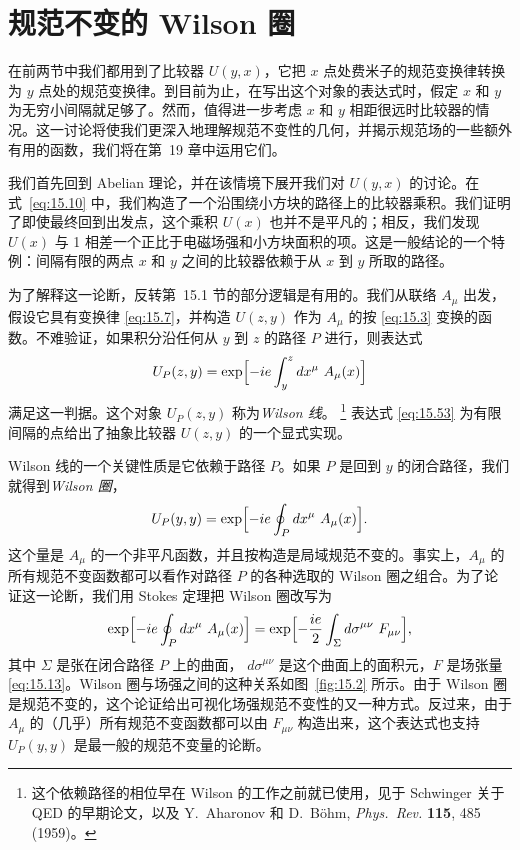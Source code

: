 \section{规范不变的 Wilson 圈}

在前两节中我们都用到了比较器 $U(y,x)$，它把 $x$ 点处费米子的规范变换律转换为 $y$ 点处的规范变换律。到目前为止，在写出这个对象的表达式时，假定 $x$ 和 $y$ 为无穷小间隔就足够了。然而，值得进一步考虑 $x$ 和 $y$ 相距很远时比较器的情况。这一讨论将使我们更深入地理解规范不变性的几何，并揭示规范场的一些额外有用的函数，我们将在第~19 章中运用它们。

我们首先回到 Abelian 理论，并在该情境下展开我们对 $U(y,x)$ 的讨论。在式~\eqref{eq:15.10} 中，我们构造了一个沿围绕小方块的路径上的比较器乘积。我们证明了即使最终回到出发点，这个乘积 $U(x)$ 也并不是平凡的；相反，我们发现 $U(x)$ 与 1 相差一个正比于电磁场强和小方块面积的项。这是一般结论的一个特例：间隔有限的两点 $x$ 和 $y$ 之间的比较器依赖于从 $x$ 到 $y$ 所取的路径。

为了解释这一论断，反转第~15.1 节的部分逻辑是有用的。我们从联络 $A_\mu$ 出发，假设它具有变换律 \eqref{eq:15.7}，并构造 $U(z,y)$ 作为 $A_\mu$ 的按 \eqref{eq:15.3} 变换的函数。不难验证，如果积分沿任何从 $y$ 到 $z$ 的路径 $P$ 进行，则表达式
\begin{equation}
  U_P(z,y) = \exp\Bigl[ -ie\int_y^z dx^\mu\ A_\mu(x) \Bigr]
  \label{eq:15.53}
\end{equation}
满足这一判据。这个对象 $U_P(z,y)$ 称为\emph{Wilson 线}。%
\footnote{这个依赖路径的相位早在 Wilson 的工作之前就已使用，见于 Schwinger 关于 QED 的早期论文，以及 Y.~Aharonov 和 D.~B\"ohm, \emph{Phys.\ Rev.} \textbf{115}, 485 (1959)。} 表达式 \eqref{eq:15.53} 为有限间隔的点给出了抽象比较器 $U(z,y)$ 的一个显式实现。

Wilson 线的一个关键性质是它依赖于路径 $P$。如果 $P$ 是回到 $y$ 的闭合路径，我们就得到\emph{Wilson 圈}，
\begin{equation}
  U_P(y,y) = \exp\Bigl[ -ie\oint_P dx^\mu\ A_\mu(x) \Bigr] .
  \label{eq:15.54}
\end{equation}
这个量是 $A_\mu$ 的一个非平凡函数，并且按构造是局域规范不变的。事实上，$A_\mu$ 的所有规范不变函数都可以看作对路径 $P$ 的各种选取的 Wilson 圈之组合。为了论证这一论断，我们用 Stokes 定理把 Wilson 圈改写为
\begin{equation}
  \exp\Bigl[ -ie\oint_P dx^\mu\ A_\mu(x) \Bigr]
  = \exp\Bigl[ -\frac{ie}{2}\int_\Sigma d\sigma^{\mu\nu}\ F_{\mu\nu} \Bigr],
  \label{eq:15.55}
\end{equation}
其中 $\Sigma$ 是张在闭合路径 $P$ 上的曲面，
$d\sigma^{\mu\nu}$ 是这个曲面上的面积元，$F$ 是场张量 \eqref{eq:15.13}。Wilson 圈与场强之间的这种关系如图~\ref{fig:15.2} 所示。由于 Wilson 圈是规范不变的，这个论证给出可视化场强规范不变性的又一种方式。反过来，由于 $A_\mu$ 的（几乎）所有规范不变函数都可以由 $F_{\mu\nu}$ 构造出来，这个表达式也支持 $U_P(y,y)$ 是最一般的规范不变量的论断。

